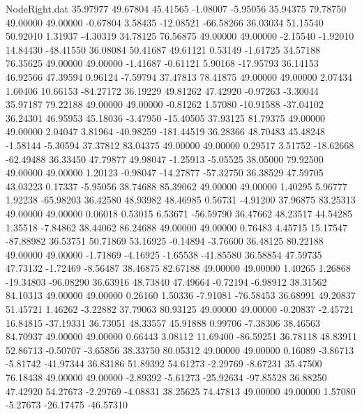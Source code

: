 \begin{filecontents}{NodeRight.dat}
  35.97977   49.67804   45.41565    -1.08007   -5.95056   35.94375   79.78750   49.00000   49.00000   -0.67804    3.58435  -12.08521  -66.58266
  36.03034   51.15540   50.92010     1.31937   -4.30319   34.78125   76.56875   49.00000   49.00000   -2.15540   -1.92010   14.84430  -48.41550
  36.08084   50.41687   49.61121     0.53149   -1.61725   34.57188   76.35625   49.00000   49.00000   -1.41687   -0.61121    5.90168  -17.95793
  36.14153   46.92566   47.39594     0.96124   -7.59794   37.47813   78.41875   49.00000   49.00000    2.07434    1.60406   10.66153  -84.27172
  36.19229   49.81262   47.42920    -0.97263   -3.30044   35.97187   79.22188   49.00000   49.00000   -0.81262    1.57080  -10.91588  -37.04102
  36.24301   46.95953   45.18036    -3.47950  -15.40505   37.93125   81.79375   49.00000   49.00000    2.04047    3.81964  -40.98259 -181.44519
  36.28366   48.70483   45.48248    -1.58144   -5.30594   37.37812   83.04375   49.00000   49.00000    0.29517    3.51752  -18.62668  -62.49488
  36.33450   47.79877   49.98047    -1.25913   -5.05525   38.05000   79.92500   49.00000   49.00000    1.20123   -0.98047  -14.27877  -57.32750
  36.38529   47.59705   43.03223     0.17337   -5.95056   38.74688   85.39062   49.00000   49.00000    1.40295    5.96777    1.92238  -65.98203
  36.42580   48.93982   48.46985     0.56731   -4.91200   37.96875   83.25313   49.00000   49.00000    0.06018    0.53015    6.53671  -56.59790
  36.47662   48.23517   44.54285     1.35518   -7.84862   38.44062   86.24688   49.00000   49.00000    0.76483    4.45715   15.17547  -87.88982
  36.53751   50.71869   53.16925    -0.14894   -3.76600   36.48125   80.22188   49.00000   49.00000   -1.71869   -4.16925   -1.65538  -41.85580
  36.58854   47.59735   47.73132    -1.72469   -8.56487   38.46875   82.67188   49.00000   49.00000    1.40265    1.26868  -19.34803  -96.08290
  36.63916   48.73840   47.49664    -0.72194   -6.98912   38.31562   84.10313   49.00000   49.00000    0.26160    1.50336   -7.91081  -76.58453
  36.68991   49.20837   51.45721     1.46262   -3.22882   37.79063   80.93125   49.00000   49.00000   -0.20837   -2.45721   16.84815  -37.19331
  36.73051   48.33557   45.91888     0.99706   -7.38306   38.46563   84.70937   49.00000   49.00000    0.66443    3.08112   11.69400  -86.59251
  36.78118   48.83911   52.86713    -0.50707   -3.65856   38.33750   80.05312   49.00000   49.00000    0.16089   -3.86713   -5.81742  -41.97344
  36.83186   51.89392   54.61273    -2.29769   -8.67231   35.47500   76.18438   49.00000   49.00000   -2.89392   -5.61273  -25.92634  -97.85528
  36.88250   47.42920   54.27673    -2.29769   -4.08831   38.25625   74.47813   49.00000   49.00000    1.57080   -5.27673  -26.17475  -46.57310

\end{filecontents}
